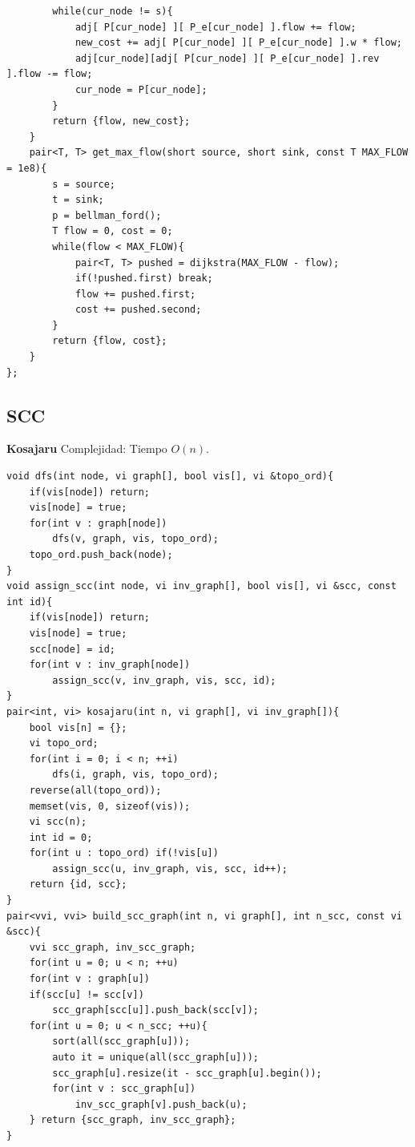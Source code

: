 \documentclass[10pt,spanish,mexico]{article}
\numberwithin{equation}{section}
\begin{document}
\begin{multicols}{2}
\begin{verbatim}
        while(cur_node != s){
            adj[ P[cur_node] ][ P_e[cur_node] ].flow += flow;
            new_cost += adj[ P[cur_node] ][ P_e[cur_node] ].w * flow;
            adj[cur_node][adj[ P[cur_node] ][ P_e[cur_node] ].rev ].flow -= flow;
            cur_node = P[cur_node];
        }
        return {flow, new_cost};
    }
    pair<T, T> get_max_flow(short source, short sink, const T MAX_FLOW = 1e8){
        s = source;
        t = sink;
        p = bellman_ford();
        T flow = 0, cost = 0;
        while(flow < MAX_FLOW){
            pair<T, T> pushed = dijkstra(MAX_FLOW - flow);
            if(!pushed.first) break;
            flow += pushed.first;
            cost += pushed.second;
        }
        return {flow, cost};
    }
};
\end{verbatim}

\vspace{-1.2\baselineskip}
\hrulefill
\subsection{SCC}
\textbf{Kosajaru}
Complejidad: Tiempo $O(n)$.
\begin{verbatim}
void dfs(int node, vi graph[], bool vis[], vi &topo_ord){
    if(vis[node]) return;
    vis[node] = true;
    for(int v : graph[node])
        dfs(v, graph, vis, topo_ord);
    topo_ord.push_back(node);
}
void assign_scc(int node, vi inv_graph[], bool vis[], vi &scc, const int id){
    if(vis[node]) return;
    vis[node] = true;
    scc[node] = id;
    for(int v : inv_graph[node])
        assign_scc(v, inv_graph, vis, scc, id);
}
pair<int, vi> kosajaru(int n, vi graph[], vi inv_graph[]){
    bool vis[n] = {};
    vi topo_ord;
    for(int i = 0; i < n; ++i)
        dfs(i, graph, vis, topo_ord);
    reverse(all(topo_ord));
    memset(vis, 0, sizeof(vis));
    vi scc(n);
    int id = 0;
    for(int u : topo_ord) if(!vis[u])
        assign_scc(u, inv_graph, vis, scc, id++);
    return {id, scc};
}
pair<vvi, vvi> build_scc_graph(int n, vi graph[], int n_scc, const vi &scc){
    vvi scc_graph, inv_scc_graph;
    for(int u = 0; u < n; ++u)
    for(int v : graph[u])
    if(scc[u] != scc[v])
        scc_graph[scc[u]].push_back(scc[v]);
    for(int u = 0; u < n_scc; ++u){
        sort(all(scc_graph[u]));
        auto it = unique(all(scc_graph[u]));
        scc_graph[u].resize(it - scc_graph[u].begin());
        for(int v : scc_graph[u])
            inv_scc_graph[v].push_back(u);
    } return {scc_graph, inv_scc_graph};
}
\end{verbatim}


\end{multicols}
\end{document}

